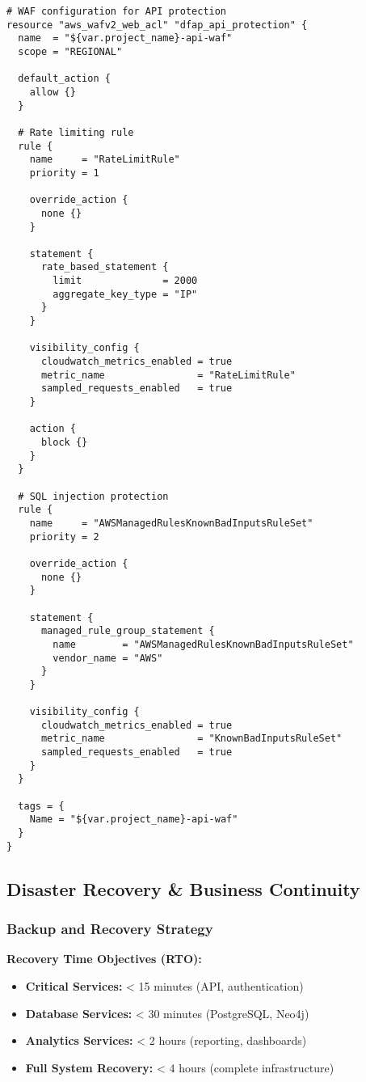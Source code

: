 \begin{verbatim}
# WAF configuration for API protection
resource "aws_wafv2_web_acl" "dfap_api_protection" {
  name  = "${var.project_name}-api-waf"
  scope = "REGIONAL"

  default_action {
    allow {}
  }

  # Rate limiting rule
  rule {
    name     = "RateLimitRule"
    priority = 1

    override_action {
      none {}
    }

    statement {
      rate_based_statement {
        limit              = 2000
        aggregate_key_type = "IP"
      }
    }

    visibility_config {
      cloudwatch_metrics_enabled = true
      metric_name                = "RateLimitRule"
      sampled_requests_enabled   = true
    }

    action {
      block {}
    }
  }

  # SQL injection protection
  rule {
    name     = "AWSManagedRulesKnownBadInputsRuleSet"
    priority = 2

    override_action {
      none {}
    }

    statement {
      managed_rule_group_statement {
        name        = "AWSManagedRulesKnownBadInputsRuleSet"
        vendor_name = "AWS"
      }
    }

    visibility_config {
      cloudwatch_metrics_enabled = true
      metric_name                = "KnownBadInputsRuleSet"
      sampled_requests_enabled   = true
    }
  }

  tags = {
    Name = "${var.project_name}-api-waf"
  }
}
\end{verbatim}

\subsection{Disaster Recovery \& Business Continuity}

\subsubsection{Backup and Recovery Strategy}

\textbf{Recovery Time Objectives (RTO):}
\begin{itemize}
  \item \textbf{Critical Services:} < 15 minutes (API, authentication)
  \item \textbf{Database Services:} < 30 minutes (PostgreSQL, Neo4j)
  \item \textbf{Analytics Services:} < 2 hours (reporting, dashboards)
  \item \textbf{Full System Recovery:} < 4 hours (complete infrastructure)
\end{itemize}

